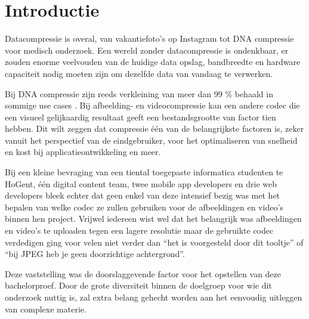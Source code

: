 
\section{Introductie} %
\label{sec:introductie}

Datacompressie is overal, van vakantiefoto's op Instagram tot DNA compressie voor medisch onderzoek. Een wereld zonder datacompressie is ondenkbaar, er zouden enorme veelvouden van de huidige data opslag, bandbreedte en hardware capaciteit nodig moeten zijn om dezelfde data van vandaag te verwerken.

Bij DNA compressie zijn reeds verkleining van meer dan 99 \% behaald in sommige use cases \autocite{Afify2011}. Bij afbeelding- en videocompressie kan een andere codec die een visueel gelijkaardig resultaat geeft een bestandsgrootte van factor tien hebben. Dit wilt zeggen dat compressie één van de belangrijkste factoren is, zeker vanuit het perspectief van de eindgebruiker, voor het optimaliseren van snelheid en kost bij applicatieontwikkeling en meer.

Bij een kleine bevraging van een tiental toegepaste informatica studenten te HoGent, één digital content team, twee mobile app developers en drie web developers bleek echter dat geen enkel van deze intensief bezig was met het bepalen van welke codec ze zullen gebruiken voor de afbeeldingen en video’s binnen hen project. Vrijwel iedereen wist wel dat het belangrijk was afbeeldingen en video’s te uploaden tegen een lagere resolutie maar de gebruikte codec verdedigen ging voor velen niet verder dan “het is voorgesteld door dit tooltje” of “bij JPEG heb je geen doorzichtige achtergrond”. 

Deze vaststelling was de doorslaggevende factor voor het opstellen van deze bachelorproef. Door de grote diversiteit binnen de doelgroep voor wie dit onderzoek nuttig is, zal extra belang gehecht worden aan het eenvoudig uitleggen van complexe materie.

